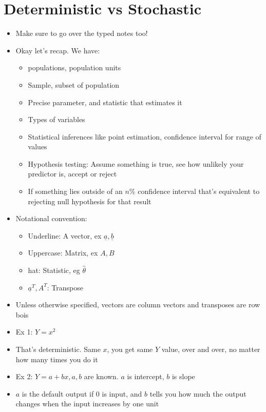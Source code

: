\documentclass{article}
\begin{document}
  \section*{Deterministic vs Stochastic}
  \begin{itemize}
    \item Make sure to go over the typed notes too!
    \item Okay let's recap. We have:
      \begin{itemize}
        \item populations, population units
        \item Sample, subset of population
        \item Precise parameter, and statistic that estimates it
        \item Types of variables
        \item Statistical inferences like point estimation, confidence interval for range of values
        \item Hypothesis testing: Assume something is true, see how unlikely your predictor is, accept or reject
        \item If something lies outside of an $ n\% $ confidence interval that's equivalent to rejecting null hypothesis for that result
      \end{itemize}
    \item Notational convention:
      \begin{itemize}
        \item Underline: A vector, ex $  \underline{a},  \underline{b} $
        \item Uppercase: Matrix, ex $ A, B $
        \item hat: Statistic, eg  $ \hat{\theta} $
        \item $ \underline{a}^T, A^T $: Transpose
      \end{itemize}
    \item Unless otherwise specified, vectors are column vectors and transposes are row bois
    \item Ex 1: $ Y = x^2 $
    \item That's deterministic. Same $ x $, you get same $ Y $ value, over and over, no matter how many times you do it
    \item Ex 2:  $ Y = a + bx, a, b $ are known. $ a $ is intercept,  $ b $ is slope
    \item $ a $ is the default output if $ 0 $ is input, and $ b $ tells you how much the output changes when the input increases by one unit

\end{itemize}
\end{document}
